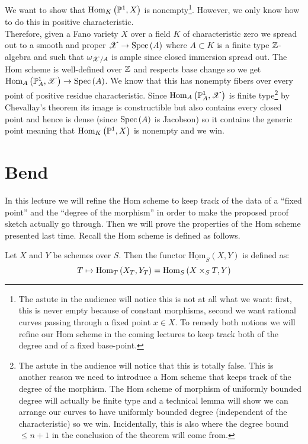 \documentclass[12pt]{article}
\newcommand{\uHom}[3]{\underline{\mathrm{Hom}}_{#1}\left(#2, #3\right)}
\begin{document}
We want to show that $\mathrm{Hom}_{K} \left( \mathbb{P}^1, X \right)$ is nonempty\footnote{The astute in the audience will notice this is not at all what we want: first, this is never empty because of constant morphisms, second we want rational curves passing through a fixed point $x \in X$. To remedy both notions we will refine our Hom scheme in the coming lectures to keep track both of the degree and of a fixed base-point.}. However, we only know how to do this in positive characteristic.
\bigskip\\ 
Therefore, given a Fano variety $X$ over a field $K$ of characteristic zero we spread out to a smooth and proper $\mathscr{X} \to \mathrm{Spec}\left( A \right)$ where $A \subset K$ is a finite type $\mathbb{Z}$-algebra and such that $\omega_{\mathscr{X} / A}$ is ample since closed immersion spread out. The Hom scheme is well-defined over $\mathbb{Z}$ and respects base change so we get $\mathrm{Hom}_{A} \left( \mathbb{P}^1_A, \mathscr{X} \right) \to \mathrm{Spec}\left( A \right)$. We know that this has nonempty fibers over every point of positive residue characteristic. Since $\mathrm{Hom}_{A} \left( \mathbb{P}^1_A, \mathscr{X} \right)$ is finite type\footnote{The astute in the audience will notice that this is totally false. This is another reason we need to introduce a Hom scheme that keeps track of the degree of the morphism. The Hom scheme of morphism of uniformly bounded degree will actually be finite type and a technical lemma will show we can arrange our curves to have uniformly bounded degree (independent of the characteristic) so we win. Incidentally, this is also where the degree bound $\le n + 1$ in the conclusion of the theorem will come from.} by Chevallay's theorem its image is constructible but also contains every closed point and hence is dense (since $\mathrm{Spec}\left( A \right)$ is Jacobson) so it contains the generic point meaning that $\mathrm{Hom}_{K} \left( \mathbb{P}^1, X \right)$ is nonempty and we win. 

\section{Bend}

\begin{rmk}
In this lecture we will refine the Hom scheme to keep track of the data of a ``fixed point'' and the ``degree of the morphism'' in order to make the proposed proof sketch actually go through. Then we will prove the properties of the Hom scheme presented last time. Recall the Hom scheme is defined as follows.
\end{rmk}

\begin{defn}
Let $X$ and $Y$ be schemes over $S$. Then the functor $\uHom{S}{X}{Y}$ is defined as:
\[ T \mapsto \mathrm{Hom}_{T} \left( X_T, Y_T \right) = \mathrm{Hom}_{S} \left( X \times_S T, Y \right) \]
\end{defn}
\end{document}
